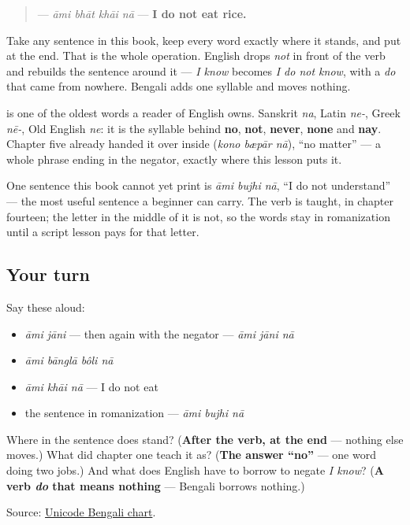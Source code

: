 \begin{quote}
\textbf{   } — \emph{āmi bhāt khāi nā} — \textbf{I do not eat rice.}
\end{quote}

Take any sentence in this book, keep every word exactly where it stands, and put \textbf{} at the end. That is the whole operation. English drops \emph{not} in front of the verb and rebuilds the sentence around it — \emph{I know} becomes \emph{I do not know}, with a \emph{do} that came from nowhere. Bengali adds one syllable and moves nothing.

\begin{cousinweb}
\textbf{} is one of the oldest words a reader of English owns. Sanskrit \emph{na}, Latin \emph{ne-}, Greek \emph{nē-}, Old English \emph{ne}: it is the syllable behind \textbf{no}, \textbf{not}, \textbf{never}, \textbf{none} and \textbf{nay}. Chapter five already handed it over inside \textbf{  } (\emph{kono bæpār nā}), \textquotedblleft{}no matter\textquotedblright{} — a whole phrase ending in the negator, exactly where this lesson puts it.

One sentence this book cannot yet print is \emph{āmi bujhi nā}, \textquotedblleft{}I do not understand\textquotedblright{} — the most useful sentence a beginner can carry. The verb is taught, in chapter fourteen; the letter in the middle of it is not, so the words stay in romanization until a script lesson pays for that letter.
\end{cousinweb}

\subsection*{Your turn}
Say these aloud:

\begin{itemize}
\raggedright
  \item \emph{āmi jāni} — then again with the negator — \emph{āmi jāni nā}
  \item \emph{āmi bānglā bôli nā}
  \item \emph{āmi khāi nā} — I do not eat
  \item the sentence in romanization — \emph{āmi bujhi nā}
\end{itemize}

\begin{tcolorbox}[breakable,colback=teal!4,colframe=teal!35!black,title={Before you move on}]
Where in the sentence does \textbf{} stand? (\textbf{After the verb, at the end} — nothing else moves.) What did chapter one teach it as? (\textbf{The answer \textquotedblleft{}no\textquotedblright{}} — one word doing two jobs.) And what does English have to borrow to negate \emph{I know}? (\textbf{A verb \emph{do} that means nothing} — Bengali borrows nothing.)

Source: \href{https://www.unicode.org/charts/PDF/U0980.pdf}{Unicode Bengali chart}.
\end{tcolorbox}
